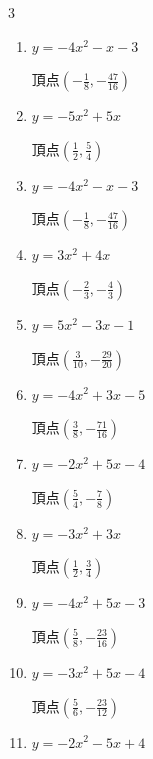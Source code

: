 \begin{multicols}{3}
\begin{enumerate}
        $\displaystyle 頂点\left( \frac{1}{2} , \frac{25}{4} \right)$

  \item $\displaystyle y=-4x^{2}-x-3$

        $\displaystyle 頂点\left( -\frac{1}{8} , -\frac{47}{16} \right)$

\columnbreak %

\resetques

  \item $\displaystyle y=-5x^{2}+5x$

        $\displaystyle 頂点\left( \frac{1}{2} , \frac{5}{4} \right)$

  \item $\displaystyle y=-4x^{2}-x-3$

        $\displaystyle 頂点\left( -\frac{1}{8} , -\frac{47}{16} \right)$

  \item $\displaystyle y=3x^{2}+4x$

        $\displaystyle 頂点\left( -\frac{2}{3} , -\frac{4}{3} \right)$

  \item $\displaystyle y=5x^{2}-3x-1$

        $\displaystyle 頂点\left( \frac{3}{10} , -\frac{29}{20} \right)$

  \item $\displaystyle y=-4x^{2}+3x-5$

        $\displaystyle 頂点\left( \frac{3}{8} , -\frac{71}{16} \right)$

\columnbreak %

  \item $\displaystyle y=-2x^{2}+5x-4$

        $\displaystyle 頂点\left( \frac{5}{4} , -\frac{7}{8} \right)$

  \item $\displaystyle y=-3x^{2}+3x$

        $\displaystyle 頂点\left( \frac{1}{2} , \frac{3}{4} \right)$

  \item $\displaystyle y=-4x^{2}+5x-3$

        $\displaystyle 頂点\left( \frac{5}{8} , -\frac{23}{16} \right)$

  \item $\displaystyle y=-3x^{2}+5x-4$

        $\displaystyle 頂点\left( \frac{5}{6} , -\frac{23}{12} \right)$

  \item $\displaystyle y=-2x^{2}-5x+4$


\end{enumerate}
\end{multicols}

